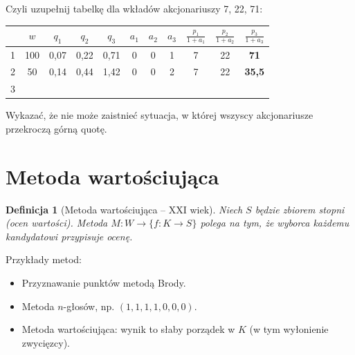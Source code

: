 \documentclass[12pt,a4paper]{article}
\theoremstyle{break}
\newtheorem{definition}{Definicja}[section]
\begin{document}
	Czyli uzupełnij tabelkę dla wkładów akcjonariuszy 7, 22, 71:\\
	
	\begin{center}
		\begin{tabular}{||c||c||c|c|c||c|c|c||c|c|c||}\hline
			&\Large$w$&\Large$q_1$&\Large$q_2$&\Large$q_3$&\Large$a_1$&\Large$a_2$&\Large$a_3$&\Large$\frac{p_1}{1+a_1}$&\Large$\frac{p_2}{1+a_2}$&\Large$\frac{p_3}{1+a_3}$\\\hline
			1&100&0,07&0,22&0,71&0&0&1&7&22&\textbf{71}\\\hline
			2&50&0,14&0,44&1,42&0&0&2&7&22&\textbf{35,5}\\\hline
			3&&&&&&&&&&\\\hline
		\end{tabular}
	\end{center}
	
	\begin{zad}
		Wykazać, że nie może zaistnieć sytuacja, w której wszyscy akcjonariusze przekroczą górną quotę.
	\end{zad}
	
	\section{Metoda wartościująca}
	
	\begin{definition}[Metoda wartościująca -- XXI wiek]
		Niech $S$ będzie zbiorem stopni (ocen wartości). Metoda $M: W \to \{ f: K \to S \}$ polega na tym, że wyborca każdemu kandydatowi przypisuje ocenę.
	\end{definition}
	
	\noindent Przykłady metod:
	\begin{itemize}
		\item Przyznawanie punktów metodą Brody.
		\item Metoda $n$-głosów, np. $(1,1,1,1,0,0,0)$.
		\item Metoda wartościująca: wynik to słaby porządek w $K$ (w tym wyłonienie zwycięzcy).
	\end{itemize}
	
\end{document}
